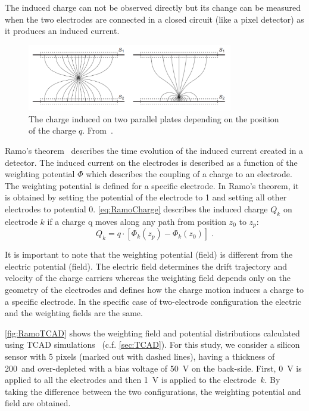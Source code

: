 The induced charge can not be observed directly but its change can be
measured when the two electrodes are connected in a closed circuit
(like a pixel detector) as it produces an induced current.

\begin{figure}[htbp]
  \centering
  \includegraphics[width=0.8\textwidth]{figures/Ramo/InducedCharge_parallelPlates.png}
  \caption{The charge induced on two parallel plates depending on the
    position of the charge $q$. From~\cite{Spieler2005}.}
  \label{fig:InducedCharge_parallelPlates}
\end{figure}

Ramo's theorem~\cite{Ramo:1939vr} describes the time evolution of the
induced current created in a detector. The induced current on the
electrodes is described as a function of the weighting potential
$\Phi$ which describes the coupling of a charge to an electrode. The
weighting potential is defined for a specific electrode. In Ramo's
theorem, it is obtained by setting the potential of the electrode to 1
and setting all other electrodes to potential 0. \cref{eq:RamoCharge}
describes the induced charge $Q_k$ on electrode $k$ if a charge q
moves along any path from position $z_0$ to $z_p$:
\begin{equation}
    Q_{k}=q \cdot [\Phi_k(z_p)-\Phi_k(z_0)] \; .
   \label{eq:RamoCharge} 
  \end{equation}

  It is important to note that the weighting potential (field) is
  different from the electric potential (field). The electric field
  determines the drift trajectory and velocity of the charge carriers
  whereas the weighting field depends only on the geometry of the
  electrodes and defines how the charge motion induces a charge to a
  specific electrode. In the specific case of two-electrode
  configuration the electric and the weighting fields are the same.


  \cref{fig:RamoTCAD} shows the weighting field and potential
  distributions calculated using TCAD simulations~\cite{synopsysTCAD}
  (c.f. \cref{sec:TCAD}). For this study, we consider a silicon sensor
  with 5 pixels (marked out with dashed lines), having a thickness of
  200~\micron and over-depleted with a bias voltage of \SI{50}{\volt}
  on the back-side. First, \SI{0}{\volt} is applied to all the
  electrodes and then \SI{1}{\volt} is applied to the
  electrode~$k$. By taking the difference between the two
  configurations, the weighting potential and field are obtained.


